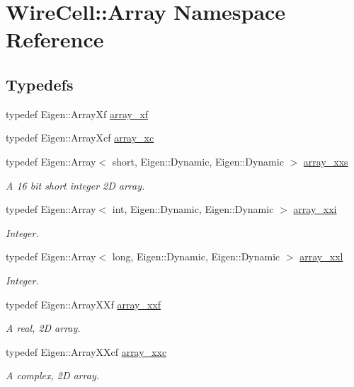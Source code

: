 \hypertarget{namespace_wire_cell_1_1_array}{}\section{Wire\+Cell\+:\+:Array Namespace Reference}
\label{namespace_wire_cell_1_1_array}
\subsection*{Typedefs}
\begin{DoxyCompactItemize}
\item 
typedef Eigen\+::\+Array\+Xf \hyperlink{namespace_wire_cell_1_1_array_ac1868a05b1fe180d6323674e8b5a3db9}{array\+\_\+xf}
\item 
typedef Eigen\+::\+Array\+Xcf \hyperlink{namespace_wire_cell_1_1_array_aa3b8841eb0edb05008f49e62484eac89}{array\+\_\+xc}
\item 
typedef Eigen\+::\+Array$<$ short, Eigen\+::\+Dynamic, Eigen\+::\+Dynamic $>$ \hyperlink{namespace_wire_cell_1_1_array_a9cfeb4a60ab1746f8295d623c49e8cd4}{array\+\_\+xxs}
\begin{DoxyCompactList}\small\item\em A 16 bit short integer 2D array. \end{DoxyCompactList}\item 
typedef Eigen\+::\+Array$<$ int, Eigen\+::\+Dynamic, Eigen\+::\+Dynamic $>$ \hyperlink{namespace_wire_cell_1_1_array_ab9b1f02c15124679d6a6f521e34a2479}{array\+\_\+xxi}
\begin{DoxyCompactList}\small\item\em Integer. \end{DoxyCompactList}\item 
typedef Eigen\+::\+Array$<$ long, Eigen\+::\+Dynamic, Eigen\+::\+Dynamic $>$ \hyperlink{namespace_wire_cell_1_1_array_a2fa3192873f7b97d7fe22d3018a73874}{array\+\_\+xxl}
\begin{DoxyCompactList}\small\item\em Integer. \end{DoxyCompactList}\item 
typedef Eigen\+::\+Array\+X\+Xf \hyperlink{namespace_wire_cell_1_1_array_ab565fef5e33632bb02f0ed4be803020c}{array\+\_\+xxf}
\begin{DoxyCompactList}\small\item\em A real, 2D array. \end{DoxyCompactList}\item 
typedef Eigen\+::\+Array\+X\+Xcf \hyperlink{namespace_wire_cell_1_1_array_a4688507545975422d74b9ba78530956a}{array\+\_\+xxc}
\begin{DoxyCompactList}\small\item\em A complex, 2D array. \end{DoxyCompactList}\end{DoxyCompactItemize}
